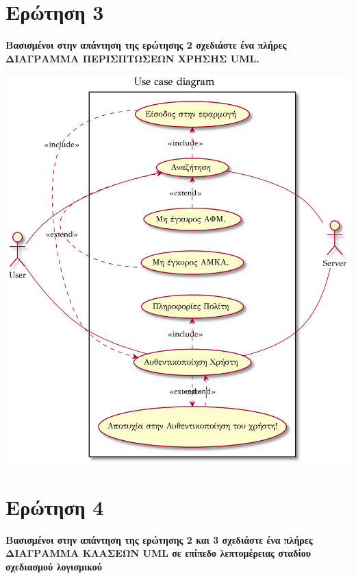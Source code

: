\documentclass[12pt]{turabian-researchpaper}
\begin{document}
\newpage
\section{Ερώτηση 3}
\textbf{Βασισμένοι στην απάντηση της ερώτησης 2 σχεδιάστε ένα πλήρες ΔΙΑΓΡΑΜΜΑ ΠΕΡΙΣΠΤΩΣΕΩΝ ΧΡΗΣΗΣ UML.}

\begin{center}
    \includegraphics[scale=0.9]{use_case_diagram.png}
\end{center}


\section{Ερώτηση 4}
\textbf{Βασισμένοι στην απάντηση της ερώτησης 2 και 3 σχεδιάστε ένα πλήρες ΔΙΑΓΡΑΜΜΑ ΚΛΑΣΕΩΝ UML σε επίπεδο λεπτομέρειας σταδίου σχεδιασμού λογισμικού }
\end{document}
